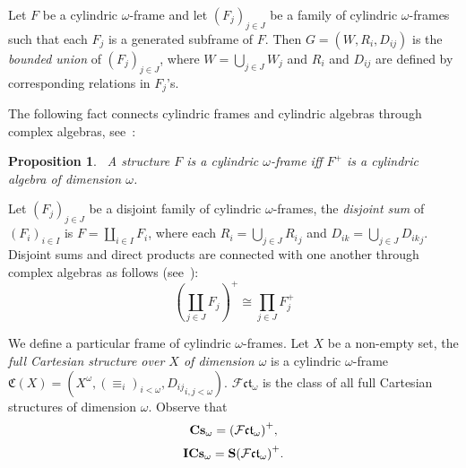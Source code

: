 \documentclass{article}
\theoremstyle{defin}
\theoremstyle{theorem}
\theoremstyle{claim}
\theoremstyle{prop}
\newtheorem{prop}{Proposition}
\theoremstyle{lemma}
\theoremstyle{fact}
\theoremstyle{remark}
\theoremstyle{ex}
\theoremstyle{col}
\theoremstyle{question}
\begin{document}
Let $F$ be a cylindric $\omega$-frame and let ${(F_j)}_{j \in J}$ be a family of cylindric 
$\omega$-frames such that each $F_j$ is a generated subframe of $F$. 
Then $G = (W, R_i, D_{ij})$ is the \emph{bounded union} of ${(F_j)}_{j \in J}$, 
where $W = \bigcup \limits_{j \in J} W_j$ and $R_i$ and $D_{ij}$ are defined by corresponding relations in $F_j$'s.

The following fact connects cylindric frames and cylindric algebras through complex algebras, see~\cite[Proposition 2.1.5]{Venema2013}:
\begin{prop}~\label{framealgebra}
A structure $F$ is a cylindric $\omega$-frame iff $F^{+}$ is a cylindric algebra of dimension $\omega$.
\end{prop}

Let ${(F_j)}_{j \in J}$ be a disjoint family of cylindric $\omega$-frames, the \emph{disjoint sum} of 
${(F_i)}_{i \in I}$ is $F = \coprod \limits_{i \in I} F_i$, 
where each $R_i = \bigcup \limits_{j \in J} {R_i}_j$ and 
$D_{ik} = \bigcup \limits_{j \in J} {D_{ik}}_j$. 
Disjoint sums and direct products are connected with one another through complex algebras as follows 
(see~\cite[Lemma 3.4.1]{goldblatt1989varieties}):
\begin{equation} \label{prod}
{(\coprod \limits_{j \in J} F_j)}^{+} \cong \prod \limits_{j \in J} F_j^{+}
\end{equation}


\vspace{\baselineskip}

We define a particular frame of cylindric $\omega$-frames. 
Let $X$ be a non-empty set, the \emph{full Cartesian structure over $X$ of dimension $\omega$} 
is a cylindric $\omega$-frame 
$\mathfrak{C}(X) = (X^{\omega}, {(\equiv_i)}_{i < \omega}, {D_{ij}}_{i, j < \omega})$. 
$\mathcal{F}\mathfrak{ct}_{\omega}$ is the class of all full Cartesian structures of dimension $\omega$. 
Observe that
\begin{equation} \label{cmcubes}
{\bf Cs}_{\omega} = {(\mathcal{F}\mathfrak{ct}_{\omega})}^{+},
\end{equation}
\begin{equation} \label{isocmcubes}
{\bf I Cs}_{\omega} = {\bf S}{(\mathcal{F}\mathfrak{ct}_{\omega})}^{+}.
\end{equation}
\end{document}
